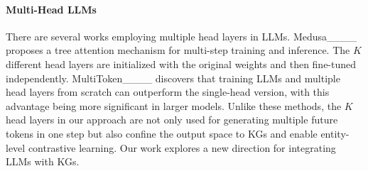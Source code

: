 \paragraph{Multi-Head LLMs}
There are several works employing multiple head layers in LLMs. Medusa____ proposes a tree attention mechanism for multi-step training and inference. The $K$ different head layers are initialized with the original weights and then fine-tuned independently. MultiToken____ discovers that training LLMs and multiple head layers from scratch can outperform the single-head version, with this advantage being more significant in larger models. Unlike these methods, the $K$ head layers in our approach are not only used for generating multiple future tokens in one step but also confine the output space to KGs and enable entity-level contrastive learning. Our work explores a new direction for integrating LLMs with KGs.